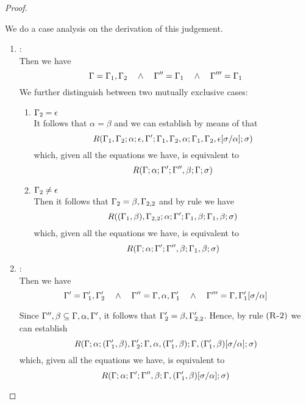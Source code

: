 \begin{proof}
\begin{description}
  We do a case analysis on the derivation of this judgement.
  \begin{enumerate}
  \item {}: \\ Then we have
\begin{equation*}
  \Gamma = \Gamma_1,\Gamma_2  \quad\wedge\quad \Gamma'' = \Gamma_1 \quad\wedge\quad \Gamma''' = \Gamma_1
\end{equation*}
  We further distinguish between two mutually exclusive cases:
  \begin{enumerate}
  \item $\Gamma_2 = \epsilon$ \\
        It follows that $\alpha = \beta$ and we can establish by means of  that
\begin{equation*}
R(\Gamma_1,\Gamma_2;\alpha;\epsilon,\Gamma';\Gamma_1,\Gamma_2,\alpha;\Gamma_1,\Gamma_2,\epsilon[\sigma/\alpha];\sigma)
\end{equation*}
        which, given all the equations we have, is equivalent to
\begin{equation*}
R(\Gamma;\alpha;\Gamma';\Gamma'',\beta;\Gamma;\sigma)
\end{equation*}

  \item $\Gamma_2 \neq \epsilon$ \\
       Then it follows that $\Gamma_2 = \beta,\Gamma_{2,2}$ and by rule  we have
\begin{equation*}
R((\Gamma_1,\beta),\Gamma_{2,2};\alpha;\Gamma';\Gamma_1,\beta;\Gamma_1,\beta;\sigma)
\end{equation*}
        which, given all the equations we have, is equivalent to
\begin{equation*}
R(\Gamma;\alpha;\Gamma';\Gamma'',\beta;\Gamma_1,\beta;\sigma)
\end{equation*}
  \end{enumerate}

  \item {}: \\
   Then we have
\begin{equation*}
  \Gamma' = \Gamma_1',\Gamma_2'  \quad\wedge\quad \Gamma'' = \Gamma,\alpha,\Gamma_1' \quad\wedge\quad 
      \Gamma''' = \Gamma,\Gamma_1'[\sigma/\alpha]
\end{equation*}

  Since $\Gamma'',\beta \subseteq \Gamma,\alpha,\Gamma'$, it follows that $\Gamma_2' = \beta,\Gamma_{2,2}'$.
  Hence, by rule $\mbox{({\tt\sc R-2})}$ we can establish
\begin{equation*}
R(\Gamma;\alpha;(\Gamma_1',\beta),\Gamma_2';\Gamma,\alpha,(\Gamma_1',\beta);\Gamma,(\Gamma_1',\beta)[\sigma/\alpha];\sigma)
\end{equation*}
        which, given all the equations we have, is equivalent to
\begin{equation*}
R(\Gamma;\alpha;\Gamma';\Gamma'',\beta;\Gamma,(\Gamma_1',\beta)[\sigma/\alpha];\sigma)
\end{equation*}
  \end{enumerate}

\end{description}
\end{proof}

